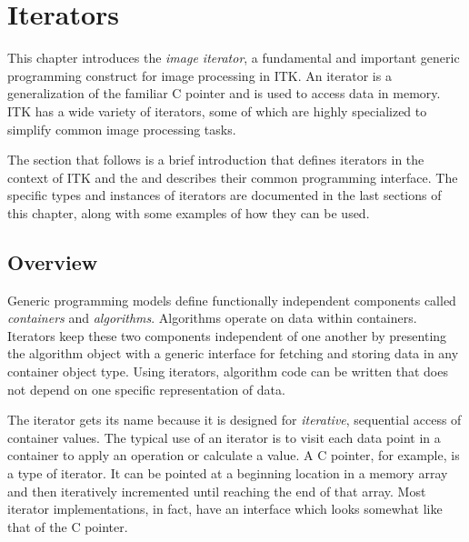 \chapter{Iterators}




This chapter introduces the \emph{image iterator}, a fundamental and important
generic programming construct for image processing in ITK.  An iterator is a
generalization of the familiar C pointer and is used to access data in memory.  ITK
has a wide variety of iterators, some of which are highly specialized to
simplify common image processing tasks.

The section that follows is a brief introduction that defines iterators in the
context of ITK and the  and describes their common programming
interface.  The specific types and instances of iterators are documented in the
last sections of this chapter, along with some examples of how they can be
used.

\section{Overview}
\label{sec:IteratorsIntroduction}
Generic programming models define functionally independent components called
\emph{containers} and \emph{algorithms}.  Algorithms operate on data
within containers.  Iterators keep these two components independent of one
another by presenting the algorithm object with a generic interface for
fetching and storing data in any container object type.  Using iterators,
algorithm code can be written that does not depend on one specific
representation of data.

The iterator gets its name because it is designed for \emph{iterative},
sequential access of container values.  The typical use of an iterator is to
visit each data point in a container to apply an operation or calculate a
value.  A C pointer, for example, is a type of iterator.  It can be pointed at
a beginning location in a memory array and then iteratively incremented until
reaching the end of that array.  Most iterator implementations, in fact, have
an interface which looks somewhat like that of the C pointer.

